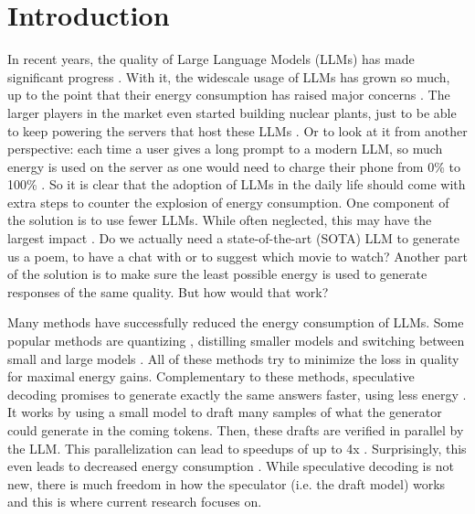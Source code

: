 \chapter{Introduction}
In recent years, the quality of Large Language Models (LLMs) has made significant progress \cite{zhao2023survey}. With it, the widescale usage of LLMs has grown so much, up to the point that their energy consumption has raised major concerns \cite{alizadeh2024analyzing, bender2021dangers, strubell2020energy}. The larger players in the market even started building nuclear plants, just to be able to keep powering the servers that host these LLMs \cite{luscombe2024three, wnn2025facebook, bbc2025ai}. Or to look at it from another perspective: each time a user gives a long prompt to a modern LLM, so much energy is used on the server as one would need to charge their phone from 0\% to 100\% \cite{epoch2025energy}. So it is clear that the adoption of LLMs in the daily life should come with extra steps to counter the explosion of energy consumption. One component of the solution is to use fewer LLMs. While often neglected, this may have the largest impact \cite{alcott2005jevons}. Do we actually need a state-of-the-art (SOTA) LLM to generate us a poem, to have a chat with or to suggest which movie to watch? Another part of the solution is to make sure the least possible energy is used to generate responses of the same quality. But how would that work?

Many methods have successfully reduced the energy consumption of LLMs. Some popular methods are quantizing \cite{frantar2022gptq, xiao2023smoothquant}, distilling smaller models \cite{grattafiori2024llama, liu2024deepseek} and switching between small and large models \cite{aggarwal2024automix}. All of these methods try to minimize the loss in quality for maximal energy gains. Complementary to these methods, speculative decoding promises to generate exactly the same answers faster, using less energy \cite{leviathan2023fast, qin2024optimized}. It works by using a small model to draft many samples of what the generator could generate in the coming tokens. Then, these drafts are verified in parallel by the LLM. This parallelization can lead to speedups of up to 4x \cite{li2024eagle}. Surprisingly, this even leads to decreased energy consumption \cite{qin2024optimized}. While speculative decoding is not new, there is much freedom in how the speculator (i.e. the draft model) works and this is where current research focuses on.

